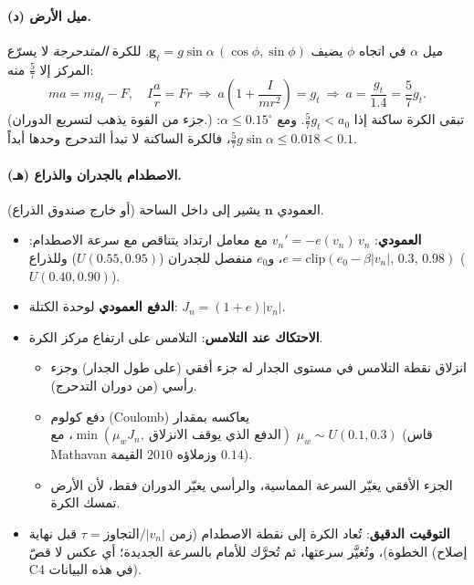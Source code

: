 \documentclass[11pt,a4paper]{article}
\newcommand{\en}[1]{\textenglish{#1}}
\begin{document}
\paragraph{(د) ميل الأرض.} ميل $\alpha$ في اتجاه $\phi$ يضيف $\bm g_t=g\sin\alpha\,(\cos\phi,\sin\phi)$. للكرة \emph{المتدحرجة} لا يسرّع
المركز إلا $\frac57$ منه:
\[ ma=mg_t-F,\quad I\frac{a}{r}=Fr\ \Rightarrow\ a\left(1+\frac{I}{mr^2}\right)=g_t\ \Rightarrow\ a=\frac{g_t}{1.4}=\frac57g_t. \]
(جزء من القوة يذهب لتسريع الدوران.) تبقى الكرة ساكنة إذا $\frac57g_t<a_0$. ومع $\alpha\le0.15^\circ$:
$\frac57g\sin\alpha\le0.018<0.1$، فالكرة الساكنة لا تبدأ التدحرج وحدها أبداً.

\paragraph{(هـ) الاصطدام بالجدران والذراع.} العمودي $\bm n$ يشير إلى داخل الساحة (أو خارج صندوق الذراع).
\begin{itemize}
\item \textbf{العمودي}: $v_n'=-e(v_n)\,v_n$ مع معامل ارتداد يتناقص مع سرعة الاصطدام:
$e=\mathrm{clip}(e_0-\beta|v_n|,\,0.3,\,0.98)$، و$e_0$ منفصل للجدران ($U(0.55,0.95)$) وللذراع ($U(0.40,0.90)$).
\item \textbf{الدفع العمودي} لوحدة الكتلة: $J_n=(1+e)|v_n|$.
\item \textbf{الاحتكاك عند التلامس}: التلامس على ارتفاع مركز الكرة.
\begin{itemize}
\item انزلاق نقطة التلامس في مستوى الجدار له جزء أفقي (على طول الجدار) وجزء رأسي (من دوران التدحرج).
\item دفع كولوم (\en{Coulomb}) يعاكسه بمقدار $\min(\mu_wJ_n,\ \text{الدفع الذي يوقف الانزلاق})$، مع $\mu_w\sim U(0.1,0.3)$
(قاس \en{Mathavan} وزملاؤه $2010$ القيمة $0.14$).
\item الجزء الأفقي يغيّر السرعة المماسية، والرأسي يغيّر الدوران فقط، لأن الأرض تمسك الكرة.
\end{itemize}
\item \textbf{التوقيت الدقيق}: تُعاد الكرة إلى نقطة الاصطدام (زمن $\tau=\text{التجاوز}/|v_n|$ قبل نهاية الخطوة)، وتُغيَّر سرعتها،
ثم تُحرَّك للأمام بالسرعة الجديدة؛ أي عكس لا قصّ (إصلاح \en{C4} في هذه البيانات).
\end{itemize}
\end{document}
